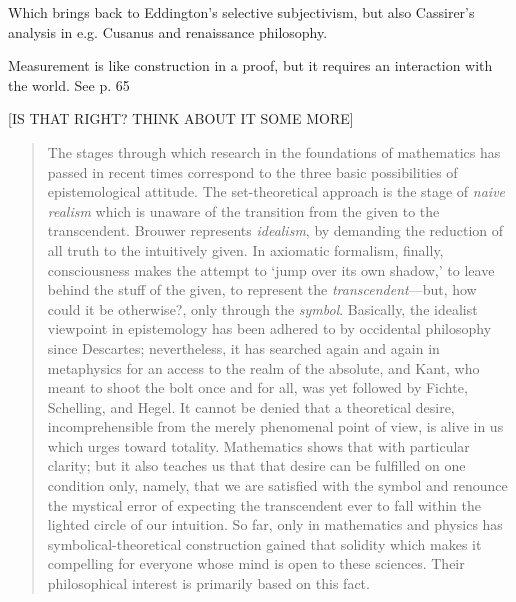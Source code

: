 Which brings back to Eddington's selective subjectivism, but also Cassirer's analysis in e.g. Cusanus and renaissance philosophy.  

Measurement is like construction in a proof, but it requires an interaction with the world. See p. 65 \citep[p. 65]{Weyl1949}

[IS THAT RIGHT? THINK ABOUT IT SOME MORE]

\begin{quote}
    The stages through which research in the foundations of mathematics has passed in recent times correspond to the three basic possibilities of epistemological attitude.  The set-theoretical approach is the stage of \emph{naive realism} which is unaware of the transition from the given to the transcendent.  Brouwer represents \emph{idealism}, by demanding the reduction of all truth to the intuitively given.  In axiomatic formalism, finally, consciousness makes the attempt to `jump over its own shadow,' to leave behind the stuff of the given, to represent the \emph{transcendent}---but, how could it be otherwise?, only through the \emph{symbol}.  Basically, the idealist viewpoint in epistemology has been adhered to by occidental philosophy since Descartes; nevertheless, it has searched again and again in metaphysics for an access to the realm of the absolute, and Kant, who meant to shoot the bolt once and for all, was yet followed by Fichte, Schelling, and Hegel.  It cannot be denied that a theoretical desire, incomprehensible from the merely phenomenal point of view, is alive in us which urges toward totality. Mathematics shows that with particular clarity; but it also teaches us that that desire can be fulfilled on one condition only, namely, that we are satisfied with the symbol and renounce the mystical error of expecting the transcendent ever to fall within the lighted circle of our intuition.  So far, only in mathematics and physics has symbolical-theoretical construction gained that solidity which makes it compelling for everyone whose mind is open to these sciences.  Their philosophical interest is primarily based on this fact.

    \citep[p. 65-66]{Weyl1949}
\end{quote}



